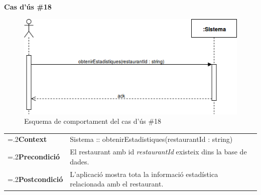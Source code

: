 \noindent\textbf{\large Cas d'ús \#18}\\
\begin{figure}[H]
\centering
\includegraphics[scale=0.6]{Figures/casdus_18.png}
\caption{Esquema de comportament del cas d'ús \#18}
\end{figure}
\begin{table}[h]
\noindent
\begin{tabularx}{\linewidth}{
>{\hsize=.2\hsize}X%
>{\hsize=0.8\hsize}X%
}
\textbf{Context} 		& Sistema :: obtenirEstadistiques(restaurantId : string) \\
\textbf{Precondició} 	& El restaurant amb id \textit{restaurantId} existeix dins la base de dades. \\
\textbf{Postcondició}	& L'aplicació mostra tota la informació estadística relacionada amb el restaurant. \\
\end{tabularx}
\label{}
\end{table}

